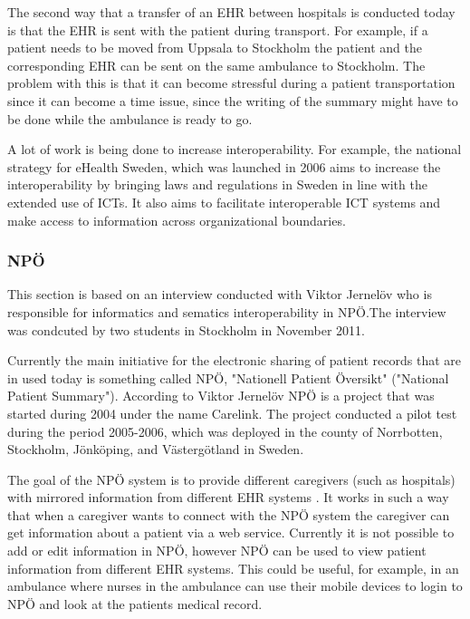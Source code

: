 \documentclass[14pt]{article}
\begin{document}
The second way that a transfer of an \gls{EHR} between hospitals is conducted today is that the \gls{EHR} is sent with the patient during transport. For example, if a patient needs to be moved from Uppsala to Stockholm the patient and the corresponding \gls{EHR} can be sent on the same ambulance to Stockholm. The problem with this is that it can become stressful during a patient transportation since it can become a time issue, since the writing of the summary might have to be done while the ambulance is ready to go.


A lot of work is being done to increase \gls{interoperability}. For example, the national strategy for eHealth Sweden, which was launched in 2006 aims to increase the interoperability by bringing laws and regulations in Sweden in line with the extended use of \glspl{ICT}. It also aims to facilitate interoperable \gls{ICT} systems and make access to information across organizational boundaries. \cite{NationalStrategy} 

\subsubsection{NPÖ} %
\label{sec:npoInterv}
This section is based on an interview conducted with Viktor Jernelöv who is responsible for informatics and sematics interoperability in NPÖ.The interview was condcuted by two students in Stockholm in November 2011. 

Currently the main initiative for the electronic sharing of patient records that are in used today is something called NPÖ, "Nationell Patient Översikt" ("National Patient Summary"). According to Viktor Jernelöv \cite {ViktorJernelov} NPÖ is a project that was started during 2004 under the name Carelink. The project conducted a pilot test during the period 2005-2006, which was deployed in the county of Norrbotten, Stockholm, Jönköping, and Västergötland in Sweden.

The goal of the NPÖ system is to provide different caregivers (such as hospitals) with mirrored information from different \gls{EHR} systems \cite{ViktorJernelov}. It works in such a way that when a caregiver wants to connect with the NPÖ system the caregiver can get information about a patient via a web service. Currently it is not possible to add or edit information in NPÖ, however NPÖ can be used to view patient information from different \gls{EHR} systems. This could be useful, for example, in an ambulance where nurses in the ambulance can use their mobile devices to login to NPÖ and look at the patients medical record.  
\end{document}

